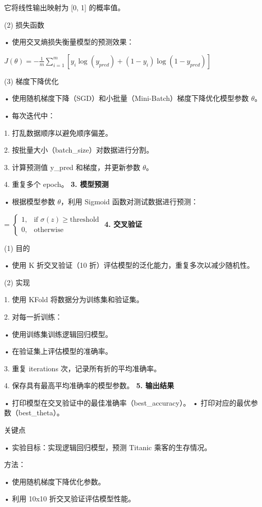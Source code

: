 \documentclass[12pt,a4paper,oneside]{article}
\begin{document}
它将线性输出映射为 [0, 1] 的概率值。

(2) 损失函数

	•	使用交叉熵损失衡量模型的预测效果：

$J(\theta) = -\frac{1}{m} \sum_{i=1}^m \left[y_i \log(y_{pred}) + (1 - y_i) \log(1 - y_{pred})\right]$


(3) 梯度下降优化

	•	使用随机梯度下降（SGD）和小批量（Mini-Batch）梯度下降优化模型参数 $\theta$。

	•	每次迭代中：

	1.	打乱数据顺序以避免顺序偏差。

	2.	按批量大小（batch\_size）对数据进行分割。

	3.	计算预测值 y\_pred 和梯度，并更新参数 $\theta$。

	4.	重复多个 epoch。
\newline\textbf{3. 模型预测}

	•	根据模型参数 $\theta$，利用 Sigmoid 函数对测试数据进行预测：

 =
$\begin{cases}
1, & \text{if } \sigma(z) \geq \text{threshold} \\
0, & \text{otherwise}
\end{cases}$
\newline\textbf{4. 交叉验证}

(1) 目的

	•	使用 K 折交叉验证（10 折）评估模型的泛化能力，重复多次以减少随机性。

(2) 实现

	1.	使用 KFold 将数据分为训练集和验证集。

	2.	对每一折训练：

	•	使用训练集训练逻辑回归模型。

	•	在验证集上评估模型的准确率。

	3.	重复 iterations 次，记录所有折的平均准确率。

	4.	保存具有最高平均准确率的模型参数。
\newline\textbf{5. 输出结果}

	•	打印模型在交叉验证中的最佳准确率（best\_accuracy）。
	•	打印对应的最优参数（best\_theta）。

关键点

	•	实验目标：实现逻辑回归模型，预测 Titanic 乘客的生存情况。

	方法：

	•	使用随机梯度下降优化参数。

	•	利用 10x10 折交叉验证评估模型性能。
\end{document}

